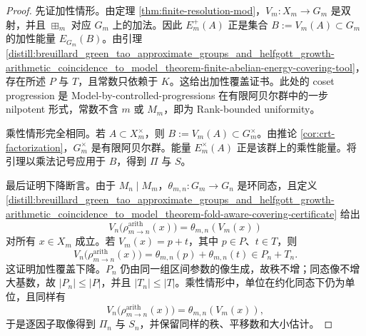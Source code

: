 \begin{proof}
先证加性情形。由定理 \ref{thm:finite-resolution-mod}，\(V_m:X_m\to G_m\) 是双射，并且 \(\boxplus_m\) 对应 \(G_m\) 上的加法。因此 \(E_m^+(A)\) 正是集合 \(B:=V_m(A)\subset G_m\) 的加性能量 \(E_{G_m}(B)\)。由引理 \ref{distill:breuillard_green_tao_approximate_groups_and_helfgott_growth-arithmetic_coincidence_to_model_theorem-finite-abelian-energy-covering-tool}，存在所述 \(P\) 与 \(T\)，且常数只依赖于 \(K\)。这给出加性覆盖证书。此处的 coset progression 是 Model-by-controlled-progressions 在有限阿贝尔群中的一步 nilpotent 形式，常数不含 \(m\) 或 \(M_m\)，即为 Rank-bounded uniformity。

乘性情形完全相同。若 \(A\subset X_m^\times\)，则 \(B:=V_m(A)\subset G_m^\times\)。由推论 \ref{cor:crt-factorization}，\(G_m^\times\) 是有限阿贝尔群。能量 \(E_m^\times(A)\) 正是该群上的乘性能量。将引理以乘法记号应用于 \(B\)，得到 \(\Pi\) 与 \(S\)。

最后证明下降断言。由于 \(M_n\mid M_m\)，\(\theta_{m,n}:G_m\to G_n\) 是环同态，且定义 \ref{distill:breuillard_green_tao_approximate_groups_and_helfgott_growth-arithmetic_coincidence_to_model_theorem-fold-aware-covering-certificate} 给出
\[
V_n\bigl(\rho^{\mathrm{arith}}_{m\to n}(x)\bigr)=\theta_{m,n}(V_m(x))
\]
对所有 \(x\in X_m\) 成立。若 \(V_m(x)=p+t\)，其中 \(p\in P\)、\(t\in T\)，则
\[
V_n\bigl(\rho^{\mathrm{arith}}_{m\to n}(x)\bigr)=\theta_{m,n}(p)+\theta_{m,n}(t)\in P_n+T_n.
\]
这证明加性覆盖下降。\(P_n\) 仍由同一组区间参数的像生成，故秩不增；同态像不增大基数，故 \(|P_n|\le |P|\)，并且 \(|T_n|\le |T|\)。乘性情形中，单位在约化同态下仍为单位，且同样有
\[
V_n\bigl(\rho^{\mathrm{arith}}_{m\to n}(x)\bigr)=\theta_{m,n}(V_m(x)),
\]
于是逐因子取像得到 \(\Pi_n\) 与 \(S_n\)，并保留同样的秩、平移数和大小估计。
\end{proof}


